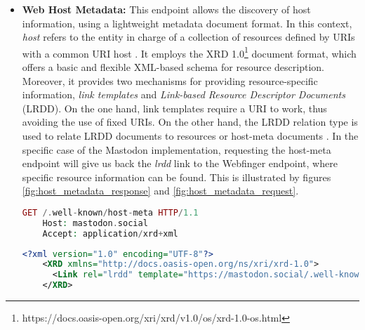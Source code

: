 \begin{itemize}
  \item \textbf{Web Host Metadata: }
    This endpoint allows the discovery of host information, using a lightweight metadata document format. In this context, \emph{host} refers to the entity in charge of a collection of resources defined by URIs with a common URI host \cite{cook_2011}. It employs the XRD 1.0\footnote{https://docs.oasis-open.org/xri/xrd/v1.0/os/xrd-1.0-os.html} document format, which offers a basic and flexible XML-based schema for resource description. Moreover, it provides two mechanisms for providing resource-specific information, \emph{link templates} and \emph{Link-based Resource Descriptor Documents} (LRDD). On the one hand, link templates require a URI to work, thus avoiding the use of fixed URIs. On the other hand, the LRDD relation type is used to relate LRDD documents to resources or host-meta documents \cite{cook_2011}. In the specific case of the Mastodon implementation, requesting the host-meta endpoint will give us back the \emph{lrdd} link to the Webfinger endpoint, where specific resource information can be found. This is illustrated by figures \ref{fig:host_metadata_response} and \ref{fig:host_metadata_request}.

\lstset{style=JSONStyle}
\begin{lstlisting}[language=PHP, caption=Example Host Metadata request to mastodon.social, label=fig:host_metadata_request, float=ht]
    GET /.well-known/host-meta HTTP/1.1
    Host: mastodon.social
    Accept: application/xrd+xml
\end{lstlisting}

\lstset{style=JSONStyle}
\begin{lstlisting}[language=XML, caption=Example Host metadata response from mastodon.social, label=fig:host_metadata_response, float=h!]
    <?xml version="1.0" encoding="UTF-8"?>
    <XRD xmlns="http://docs.oasis-open.org/ns/xri/xrd-1.0">
      <Link rel="lrdd" template="https://mastodon.social/.well-known/webfinger?resource={uri}"/>
    </XRD>
\end{lstlisting}


\end{itemize}
